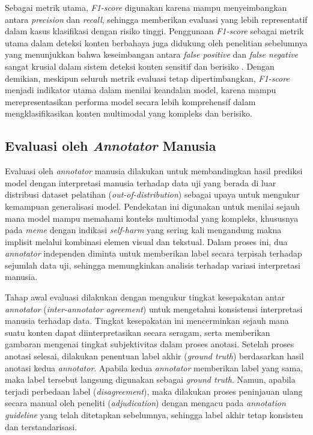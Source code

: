 Sebagai metrik utama, \textit{F1-score} digunakan karena mampu menyeimbangkan antara \textit{precision} dan \textit{recall}, sehingga memberikan evaluasi yang lebih representatif dalam kasus klasifikasi dengan risiko tinggi. Penggunaan \textit{F1-score} sebagai metrik utama dalam deteksi konten berbahaya juga didukung oleh penelitian sebelumnya yang menunjukkan bahwa keseimbangan antara \textit{false positive} dan \textit{false negative} sangat krusial dalam sistem deteksi konten sensitif dan berisiko \cite{Sokolova2009Performance} \cite{Sharma2022HarmfulMemes}. Dengan demikian, meskipun seluruh metrik evaluasi tetap dipertimbangkan, \textit{F1-score} menjadi indikator utama dalam menilai keandalan model, karena mampu merepresentasikan performa model secara lebih komprehensif dalam mengklasifikasikan konten multimodal yang kompleks dan berisiko.


\subsection{Evaluasi oleh \textit{Annotator} Manusia} \label{subsec:evaluasi_annotator_manusia}
Evaluasi oleh \textit{annotator} manusia dilakukan untuk membandingkan hasil prediksi model dengan interpretasi manusia terhadap data uji yang berada di luar distribusi dataset pelatihan (\textit{out-of-distribution}) sebagai upaya untuk mengukur kemampuan generalisasi model. Pendekatan ini digunakan untuk menilai sejauh mana model mampu memahami konteks multimodal yang kompleks, khususnya pada \textit{meme} dengan indikasi \textit{self-harm} yang sering kali mengandung makna implisit melalui kombinasi elemen visual dan tekstual. Dalam proses ini, dua \textit{annotator} independen diminta untuk memberikan label secara terpisah terhadap sejumlah data uji, sehingga memungkinkan analisis terhadap variasi interpretasi manusia.

Tahap awal evaluasi dilakukan dengan mengukur tingkat kesepakatan antar \textit{annotator} (\textit{inter-annotator agreement}) untuk mengetahui konsistensi interpretasi manusia terhadap data. Tingkat kesepakatan ini mencerminkan sejauh mana suatu konten dapat diinterpretasikan secara seragam, serta memberikan gambaran mengenai tingkat subjektivitas dalam proses anotasi. Setelah proses anotasi selesai, dilakukan penentuan label akhir (\textit{ground truth}) berdasarkan hasil anotasi kedua \textit{annotator}. Apabila kedua \textit{annotator} memberikan label yang sama, maka label tersebut langsung digunakan sebagai \textit{ground truth}. Namun, apabila terjadi perbedaan label (\textit{disagreement}), maka dilakukan proses peninjauan ulang secara manual oleh peneliti (\textit{adjudication}) dengan mengacu pada \textit{annotation guideline} yang telah ditetapkan sebelumnya, sehingga label akhir tetap konsisten dan terstandarisasi.

